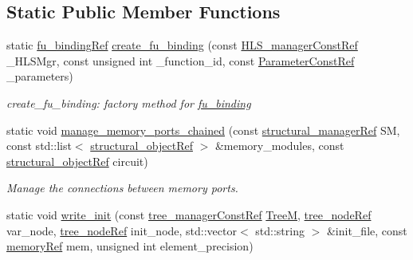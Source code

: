 \subsection*{Static Public Member Functions}
\begin{DoxyCompactItemize}
\item 
static \hyperlink{fu__binding_8hpp_a619181df8ab98d7b7e17de58ac44b065}{fu\+\_\+binding\+Ref} \hyperlink{classfu__binding_a81b205a4f6b735fcd971cf3315c85e14}{create\+\_\+fu\+\_\+binding} (const \hyperlink{hls__manager_8hpp_a1b481383e3beabc89bd7562ae672dd8c}{H\+L\+S\+\_\+manager\+Const\+Ref} \+\_\+\+H\+L\+S\+Mgr, const unsigned int \+\_\+function\+\_\+id, const \hyperlink{Parameter_8hpp_a37841774a6fcb479b597fdf8955eb4ea}{Parameter\+Const\+Ref} \+\_\+parameters)
\begin{DoxyCompactList}\small\item\em create\+\_\+fu\+\_\+binding\+: factory method for \hyperlink{classfu__binding}{fu\+\_\+binding} \end{DoxyCompactList}\item 
static void \hyperlink{classfu__binding_a29c11d53e1beb8a97c8968a67a935d8b}{manage\+\_\+memory\+\_\+ports\+\_\+chained} (const \hyperlink{structural__manager_8hpp_ab3136f0e785d8535f8d252a7b53db5b5}{structural\+\_\+manager\+Ref} SM, const std\+::list$<$ \hyperlink{structural__objects_8hpp_a8ea5f8cc50ab8f4c31e2751074ff60b2}{structural\+\_\+object\+Ref} $>$ \&memory\+\_\+modules, const \hyperlink{structural__objects_8hpp_a8ea5f8cc50ab8f4c31e2751074ff60b2}{structural\+\_\+object\+Ref} circuit)
\begin{DoxyCompactList}\small\item\em Manage the connections between memory ports. \end{DoxyCompactList}\item 
static void \hyperlink{classfu__binding_adf23b4232428cdc1ecb9247926b58a2e}{write\+\_\+init} (const \hyperlink{tree__manager_8hpp_a792e3f1f892d7d997a8d8a4a12e39346}{tree\+\_\+manager\+Const\+Ref} \hyperlink{classfu__binding_a4de9ee3ee6567c737372884783011a2e}{TreeM}, \hyperlink{tree__node_8hpp_a6ee377554d1c4871ad66a337eaa67fd5}{tree\+\_\+node\+Ref} var\+\_\+node, \hyperlink{tree__node_8hpp_a6ee377554d1c4871ad66a337eaa67fd5}{tree\+\_\+node\+Ref} init\+\_\+node, std\+::vector$<$ std\+::string $>$ \&init\+\_\+file, const \hyperlink{memory_8hpp_aec1333ec6cd561731fb3ed3e55b9caf5}{memory\+Ref} mem, unsigned int element\+\_\+precision)
\end{DoxyCompactItemize}
